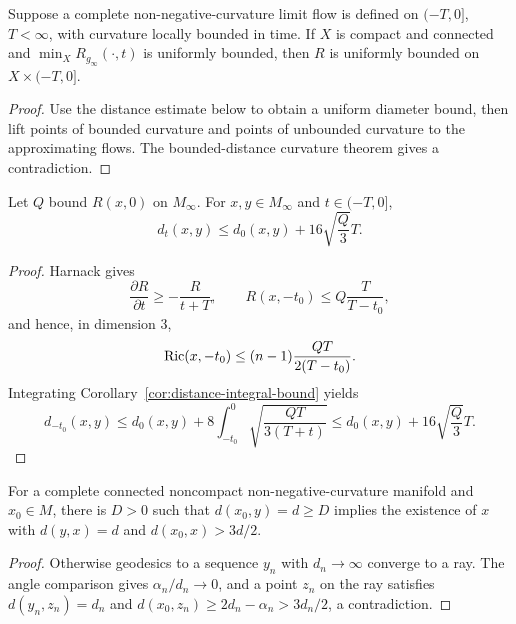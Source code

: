 \begin{lemma}
\label{lem:curvature-bound-compact-subset}\label{compactbd}
Suppose a complete non-negative-curvature limit flow is defined on $(-T,0]$,
$T<\infty$, with curvature locally bounded in time. If $X$ is compact and
connected and $\min_XR_{g_\infty}(\cdot,t)$ is uniformly bounded, then $R$ is
uniformly bounded on $X\times(-T,0]$.
\end{lemma}
\begin{proof}\sketch Use the
distance estimate below to obtain a uniform diameter bound, then lift points
of bounded curvature and points of unbounded curvature to the approximating
flows. The bounded-distance curvature theorem gives a contradiction.\end{proof}

\begin{claim}
\label{claim:distance-distortion-bound}\label{distch}
Let $Q$ bound $R(x,0)$ on $M_\infty$. For $x,y\in M_\infty$ and
$t\in(-T,0]$,
$$d_t(x,y)\le d_0(x,y)+16\sqrt{\frac Q3}T.$$
\end{claim}
\begin{proof}\sketch Harnack gives
$$\frac{\partial R}{\partial t}\ge-\frac R{t+T},\qquad
R(x,-t_0)\le Q\frac T{T-t_0},$$
and hence, in dimension $3$,
$$\operatorname{Ric}(x,-t_0)\le(n-1)\frac{QT}{2(T-t_0)}.$$
Integrating Corollary~\ref{cor:distance-integral-bound} yields
$$d_{-t_0}(x,y)\le d_0(x,y)+8\int_{-t_0}^0\sqrt{\frac{QT}{3(T+t)}}
\le d_0(x,y)+16\sqrt{\frac Q3}T.$$
\end{proof}

\begin{lemma}
\label{lem:far-point-with-distant-antipode}
For a complete connected noncompact non-negative-curvature manifold and
$x_0\in M$, there is $D>0$ such that $d(x_0,y)=d\ge D$ implies the existence
of $x$ with $d(y,x)=d$ and $d(x_0,x)>3d/2$.
\end{lemma}
\begin{proof}\sketch Otherwise geodesics to a
sequence $y_n$ with $d_n\to\infty$ converge to a ray. The angle comparison
gives $\alpha_n/d_n\to0$, and a point $z_n$ on the ray satisfies
$d(y_n,z_n)=d_n$ and $d(x_0,z_n)\ge2d_n-\alpha_n>3d_n/2$, a contradiction.\end{proof}

